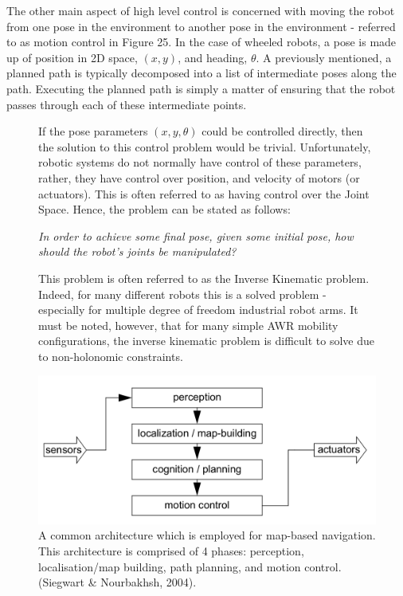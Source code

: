 \documentclass[a4paper]{article}
\begin{document}
The other main aspect of high level control is concerned with moving the robot from one pose in the environment to another pose in the environment - referred to as motion control in Figure 25. In the case of wheeled robots, a pose is made up of position in 2D space, $(x,y)$, and heading, $\theta$. A previously mentioned, a planned path is typically decomposed into a list of intermediate poses along the path. Executing the planned path is simply a matter of ensuring that the robot passes through each of these intermediate points. 
\begin{figure}[h]
\begin{minipage}{0.45\textwidth}
If the pose parameters $(x, y, \theta)$ could be controlled directly, then the solution to this control problem would be trivial. Unfortunately, robotic systems do not normally have control of these parameters, rather, they have control over position, and velocity of motors (or actuators). This is often referred to as having control over the Joint Space. Hence, the problem can be stated as follows:

\vspace{0.5cm}

\textit{In order to achieve some final pose, given some initial pose, how should the robot's joints be manipulated?}

\vspace{0.5cm}

This problem is often referred to as the Inverse Kinematic problem. Indeed, for many different robots this is a solved problem - especially for multiple degree of freedom industrial robot arms. It must be noted, however, that for many simple AWR mobility configurations, the inverse kinematic problem is difficult to solve due to non-holonomic constraints.
\end{minipage}
\hspace{1cm}
\begin{minipage}{0.45\textwidth}
\centering
\includegraphics[scale=0.23]{high_level_strategy}
\caption{A common architecture which is employed for map-based navigation. This architecture is comprised of 4 phases: perception, localisation/map building, path planning, and motion control. (Siegwart \& Nourbakhsh, 2004).}
\end{minipage}
\end{figure}
\end{document}
